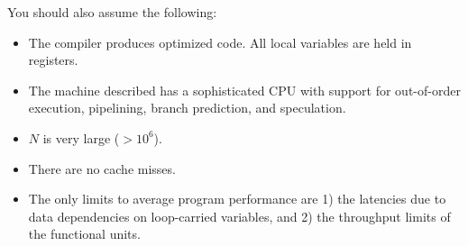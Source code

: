 \documentclass[11pt]{article}
\begin{document}
You should also assume the following:
\begin{itemize}
        \item The compiler produces optimized code.  All local variables are held in registers.
	\item The machine described has a sophisticated CPU with
	support for out-of-order execution, pipelining, branch prediction, and speculation.
	\item $N$ is very large ($> 10^{6}$).
	\item There are no cache misses.
        \item The only limits to average program performance are 1) the latencies due to data
          dependencies on loop-carried variables, and 2) the
          throughput limits of the functional units.
\end{itemize}
\end{document}
